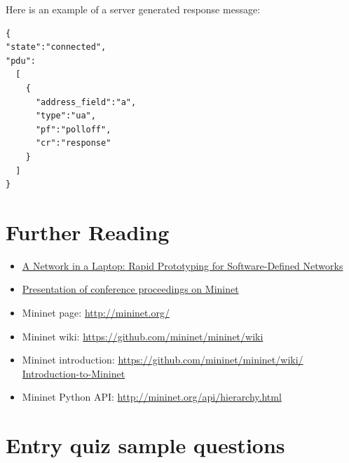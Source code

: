 \documentclass[a4paper]{article}
\begin{document}
Here is an example of a server generated response message:
\begin{verbatim}
{
"state":"connected",
"pdu":
  [
    {
      "address_field":"a",
      "type":"ua",
      "pf":"polloff",
      "cr":"response"
    }
  ]
}
\end{verbatim}




\section{Further Reading}

\begin{itemize}
    \item \href{https://qosip.tmit.bme.hu/foswiki/pub/Meres/OpenFlowMScMeresiSegedlet/a19-lantz.pdf}{A Network in a
              Laptop: Rapid Prototyping for Software-Defined Networks}
    \item

          \href{https://qosip.tmit.bme.hu/foswiki/pub/Meres/OpenFlowMScMeresiSegedlet/mininet-hotnets2010-final.pdf}{Presentation
              of conference proceedings on Mininet}
    \item	Mininet page: \url{http://mininet.org/}
    \item	Mininet wiki: \url{https://github.com/mininet/mininet/wiki}
    \item	Mininet introduction: \url{https://github.com/mininet/mininet/wiki/  Introduction-to-Mininet}
    \item	Mininet Python API: \url{http://mininet.org/api/hierarchy.html}
\end{itemize}

\appendix

\section{Entry quiz sample questions}

\end{document}
